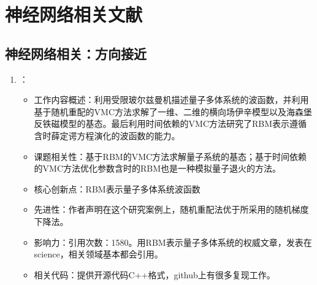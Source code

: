 \chapter{神经网络相关文献}
\section{神经网络相关：方向接近}
    \begin{enumerate}
        \item \citet{carleo2017solving}：
            \begin{itemize}
                \item 工作内容概述：利用受限玻尔兹曼机描述量子多体系统的波函数，并利用基于随机重配\citep{sorella2007weak}的VMC方法求解了一维、二维的横向场伊辛模型以及海森堡反铁磁模型的基态。最后利用时间依赖的VMC方法\citep{carleo2012localization, carleo2014light}研究了RBM表示遵循含时薛定谔方程演化的波函数的能力。
                \item 课题相关性：基于RBM的VMC方法求解量子系统的基态；基于时间依赖的VMC方法优化参数含时的RBM也是一种模拟量子退火的方法。
                \item 核心创新点：RBM表示量子多体系统波函数
                \item 先进性：作者声明在这个研究案例上，随机重配法优于\citet{harju1997stochastic}所采用的随机梯度下降法。
                \item 影响力：引用次数：1580。用RBM表示量子多体系统的权威文章，发表在science，相关领域基本都会引用。
                \item 相关代码：提供开源代码C++格式，github上有很多复现工作。
            \end{itemize}

        \end{enumerate}


